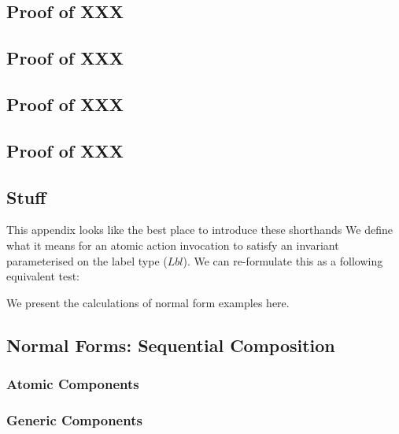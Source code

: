 \subsection{Proof of XXX}

\subsection{Proof of XXX}

\subsection{Proof of XXX}

\subsection{Proof of XXX}

\subsection{Stuff}
This appendix looks like the best place to introduce these shorthands
We define what it means for an atomic action invocation
to satisfy an invariant parameterised on the label type ($Lbl$).
We can re-formulate this as a following equivalent test:

We present the calculations of normal form examples here.

\subsection{Normal Forms: Sequential Composition}

\subsubsection{Atomic Components}

\subsubsection{Generic Components}


